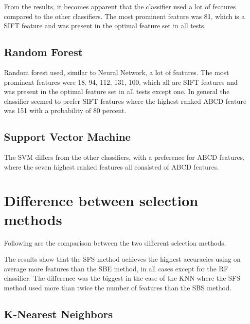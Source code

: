 \documentclass{kththesis}
\begin{document}

From the results, it becomes apparent that the classifier used a lot of features compared to the other classifiers. The most prominent feature was 81, which is a SIFT feature and was present in the optimal feature set in all tests.

\subsection{Random Forest}


Random forest used, similar to Neural Network, a lot of features. The most prominent features were 18, 94, 112, 131, 100, which all are SIFT features and was present in the optimal feature set in all tests except one. In general the classifier seemed to prefer SIFT features where the highest ranked ABCD feature was 151 with a probability of 80 percent.

\subsection{Support Vector Machine}

The SVM differs from the other classifiers, with a preference for ABCD features, where the seven highest ranked features all consisted of ABCD features.


\section{Difference between selection methods}

Following are the comparison between the two different selection methods. 



The results show that the SFS method achieves the highest accuracies using on average more features than the SBE method, in all cases except for the RF classifier. The difference was the biggest in the case of the KNN where the SFS method used more than twice the number of features than the SBS method.

\subsection{K-Nearest Neighbors}
\end{document}
